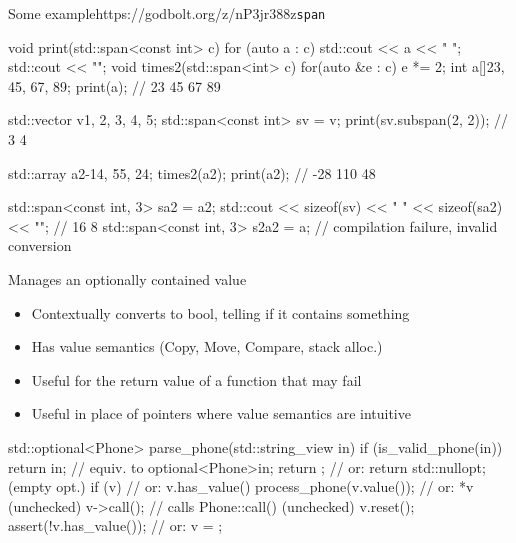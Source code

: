 \begin{frame}[fragile]
  \begin{exampleblockGB}{Some example}{https://godbolt.org/z/nP3jr388z}{\texttt{span}}
    \scriptsize
    \begin{cppcode*}{}
      void print(std::span<const int> c) {
        for (auto a : c) { std::cout << a << " "; }
        std::cout << "\n";
      }
      void times2(std::span<int> c) {
        for(auto &e : c) { e *= 2; }
      }
      int a[]{23, 45, 67, 89};
      print(a);                 // 23 45 67 89

      std::vector v{1, 2, 3, 4, 5};
      std::span<const int> sv = v;
      print(sv.subspan(2, 2));  // 3 4

      std::array a2{-14, 55, 24};
      times2(a2);
      print(a2);                // -28 110 48

      std::span<const int, 3> sa2 = a2;
      std::cout << sizeof(sv) << " " << sizeof(sa2) << "\n";  // 16 8
      std::span<const int, 3> s2a2 = a; // compilation failure, invalid conversion
    \end{cppcode*}
  \end{exampleblockGB}
\end{frame}

\begin{frame}[fragile]
  \begin{block}{Manages an optionally contained value}
    \begin{itemize}
    \item Contextually converts to bool, telling if it contains something
    \item Has value semantics (Copy, Move, Compare, stack alloc.)
    \item Useful for the return value of a function that may fail
    \item Useful in place of pointers where value semantics are intuitive
    \end{itemize}
  \end{block}
  \begin{exampleblock}{}
    \small
    \begin{cppcode*}{}
      std::optional<Phone> parse_phone(std::string_view in) {
        if (is_valid_phone(in))
          return in; // equiv. to optional<Phone>{in};
        return {};   // or: return std::nullopt; (empty opt.)
      }
      if (v) {                    // or: v.has_value()
        process_phone(v.value()); // or: *v (unchecked)
        v->call(); // calls Phone::call()   (unchecked)
      }
      v.reset(); assert(!v.has_value()); // or: v = {};
    \end{cppcode*}
  \end{exampleblock}
\end{frame}

